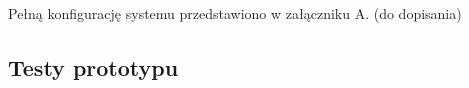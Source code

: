 Pełną konfigurację systemu przedstawiono w załączniku A. (do dopisania)

\subsection{Testy prototypu}
\label{subsec:testy_prototypu}

